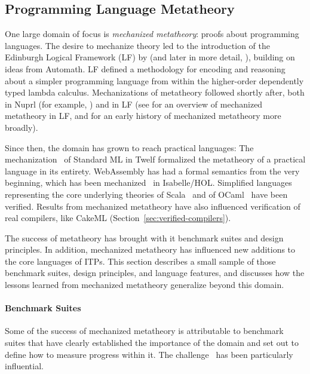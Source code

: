 \subsection{Programming Language Metatheory}
\label{sec:dsmetatheory}


One large domain of focus is \textit{mechanized metatheory}:
proofs about programming languages. The desire to mechanize theory led to the introduction of the 
Edinburgh Logical Framework (LF) by \cite{Harper1987} (and later in more detail, \cite{Harper1993}),
building on ideas from Automath.
LF defined a methodology for encoding and reasoning about a simpler programming language from within the higher-order dependently typed
lambda calculus. Mechanizations of metatheory followed shortly after, both in Nuprl (for example, \cite{howe1988computational})
and in LF (see \cite{Harper2007} for an overview of mechanized metatheory in LF, and \cite{harrison-reflection} for
an early history of mechanized metatheory more broadly).

Since then, the domain has grown to reach practical languages:
The mechanization~ \citep{mechanized-sml} of Standard ML in Twelf formalized
the metatheory of a practical language in its entirety.
WebAssembly has had a formal semantics from the very beginning, which has been mechanized~\citep{watt2018mechanising}
in Isabelle/HOL.
Simplified languages representing the core underlying theories of Scala~\citep{Rompf2016, Amin2017} and of
OCaml~\citep{owens2008} have been verified. 
Results from mechanized metatheory have also influenced verification of real compilers,
like CakeML (Section~\ref{sec:verified-compilers}).

The success of metatheory has brought with it benchmark suites and design principles.
In addition, mechanized metatheory has influenced new additions to the core languages of ITPs.
This section describes a small sample of those benchmark suites, design principles, and language features,
and discusses how the lessons learned from mechanized metatheory generalize beyond
this domain.

\paragraph{Benchmark Suites} Some of the success of mechanized metatheory is attributable
to benchmark suites that have clearly established the importance of the domain
and set out to define how to measure progress within it. The
\poplmark challenge~\citep{Aydemir2005} has been particularly influential.

